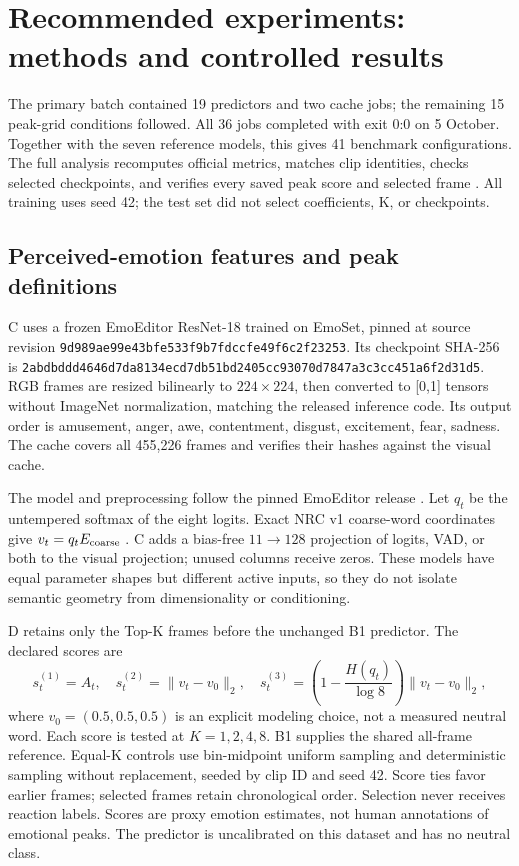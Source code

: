 \section{Recommended experiments: methods and controlled results}
The primary batch contained 19 predictors and two cache jobs; the remaining 15 peak-grid conditions followed. All 36 jobs completed with exit 0:0 on 5 October. Together with the seven reference models, this gives 41 benchmark configurations. The full analysis recomputes official metrics, matches clip identities, checks selected checkpoints, and verifies every saved peak score and selected frame \cite{extendedresults}. All training uses seed 42; the test set did not select coefficients, K, or checkpoints.

\subsection{Perceived-emotion features and peak definitions}
C uses a frozen EmoEditor ResNet-18 trained on EmoSet, pinned at source revision \nolinkurl{9d989ae99e43bfe533f9b7fdccfe49f6c2f23253}. Its checkpoint SHA-256 is \nolinkurl{2abdbddd4646d7da8134ecd7db51bd2405cc93070d7847a3c3cc451a6f2d31d5}. RGB frames are resized bilinearly to $224\times224$, then converted to [0,1] tensors without ImageNet normalization, matching the released inference code. Its output order is amusement, anger, awe, contentment, disgust, excitement, fear, sadness. The cache covers all 455,226 frames and verifies their hashes against the visual cache.

The model and preprocessing follow the pinned EmoEditor release \cite{emoeditor}. Let $q_t$ be the untempered softmax of the eight logits. Exact NRC v1 coarse-word coordinates give $v_t=q_tE_{\rm coarse}$ \cite{nrc}. C adds a bias-free $11\to128$ projection of logits, VAD, or both to the visual projection; unused columns receive zeros. These models have equal parameter shapes but different active inputs, so they do not isolate semantic geometry from dimensionality or conditioning.

D retains only the Top-K frames before the unchanged B1 predictor. The declared scores are
\begin{equation}
s_t^{(1)}=A_t,\quad s_t^{(2)}=\|v_t-v_0\|_2,\quad
s_t^{(3)}=\left(1-\frac{H(q_t)}{\log8}\right)\|v_t-v_0\|_2,
\end{equation}
where $v_0=(0.5,0.5,0.5)$ is an explicit modeling choice, not a measured neutral word. Each score is tested at $K=1,2,4,8$. B1 supplies the shared all-frame reference. Equal-K controls use bin-midpoint uniform sampling and deterministic sampling without replacement, seeded by clip ID and seed 42. Score ties favor earlier frames; selected frames retain chronological order. Selection never receives reaction labels. Scores are proxy emotion estimates, not human annotations of emotional peaks. The predictor is uncalibrated on this dataset and has no neutral class.

